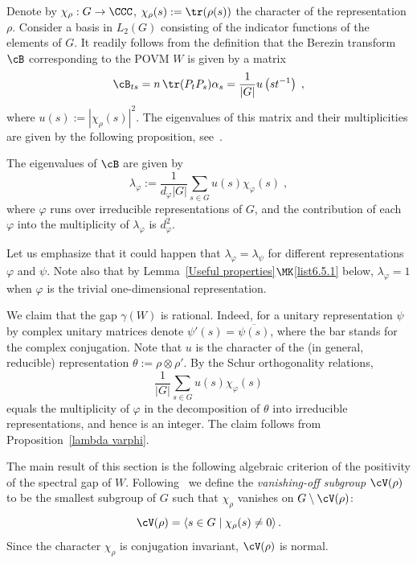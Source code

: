 Denote by $\chi_\rho:G \to \CCC$, $\chi_\rho(s) := \tr (\rho(s))$ the character of the representation $\rho$. Consider a basis in $L_2(G)$ consisting of the indicator functions of the elements of $G$. It readily follows from the definition that the Berezin transform $\cB$ corresponding to the POVM $W$ is given by a matrix
\[
\cB_{ts} = n \,\tr(P_tP_s) \alpha_s = \frac{1}{| G |}u\left(st^{-1}\right)\;,
\]
where $u(s) := | \chi_\rho(s) | ^2$. The eigenvalues of this matrix and their multiplicities are given by the following proposition, see~\cite[Chapter~3E]{Diaconis}.

\begin{prop}\label{lambda varphi}
The eigenvalues of $\cB$ are given by
\[
\lambda_\varphi := \frac{1}{d_\varphi| G|}\sum_{s\in G} u(s)\chi_\varphi(s)\;,
\]
where $\varphi$ runs over irreducible representations of $G$, and the contribution of each $\varphi$ into the multiplicity of $\lambda_\varphi$ is $d^2_\varphi$.
\end{prop}

Let us emphasize that it could happen that $\lambda_\varphi=\lambda_\psi$ for different representations $\varphi$ and $\psi$. Note also that by Lemma~\ref{Useful properties}$\MK$\eqref{list6.5.1} below, $\lambda_\varphi = 1$ when $\varphi$ is the trivial one-dimensional representation.

\begin{rema}
We claim that the gap $\gamma(W)$ is rational. Indeed, for a unitary representation $\psi$
by complex unitary matrices denote $\psi' (s) = \overline{\psi(s)}$, where the bar stands for the complex conjugation. Note that $u$ is the character
of the (in general, reducible) representation $\theta:= \rho \otimes \rho'$. By the Schur orthogonality relations,
\[
\frac{1}{| G|}\sum_{s\in G} u(s)\chi_\varphi(s)
\]
equals the multiplicity of $\varphi$ in the decomposition of $\theta$ into irreducible representations, and hence is an integer. The claim follows from Proposition~\ref{lambda varphi}.
\end{rema}

The main result of this section is the following algebraic criterion of the positivity of the spectral gap of $W$. Following~\cite[Chapter~12]{Isaacs} we define the \emph{vanishing-off subgroup} $\cV(\rho)$ to be the smallest subgroup of $G$ such that $\chi_\rho$ vanishes on $G \setminus \cV(\rho)$:
\[
\cV(\rho) = \left\langle s\in G \mid \chi_\rho(s)\not=0\right\rangle.
\]
Since the character $\chi_\rho$ is conjugation invariant, $\cV(\rho)$ is normal.

